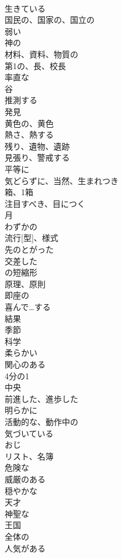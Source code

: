 \documentclass[8pt]{extreport}
\begin{document}
\begin{CJK}{UTF8}{min}
\\	生きている	
\\	国民の、国家の、国立の	
\\	弱い	
\\	神の	
\\	材料、資料、物質の	
\\	第1の、長、校長	
\\	率直な	
\\	谷	
\\	推測する	
\\	発見	
\\	黄色の、黄色	
\\	熱さ、熱する	
\\	残り、遺物、遺跡	
\\	見張り、警戒する	
\\	平等に	
\\	気どらずに、当然、生まれつき	
\\	箱、1箱	
\\	注目すべき、目につく	
\\	月	
\\	わずかの	
\\	流行[型]、様式	
\\	先のとがった	
\\	交差した	
\\	の短縮形	
\\	原理、原則	
\\	即座の	
\\	喜んで…する	
\\	結果	
\\	季節	
\\	科学	
\\	柔らかい	
\\	関心のある	
\\	4分の1	
\\	中央	
\\	前進した、進歩した	
\\	明らかに	
\\	活動的な、動作中の	
\\	気づいている	
\\	おじ	
\\	リスト、名簿	
\\	危険な	
\\	威厳のある	
\\	穏やかな	
\\	天才	
\\	神聖な	
\\	王国	
\\	全体の	
\\	人気がある	

\end{CJK}
\end{document}
